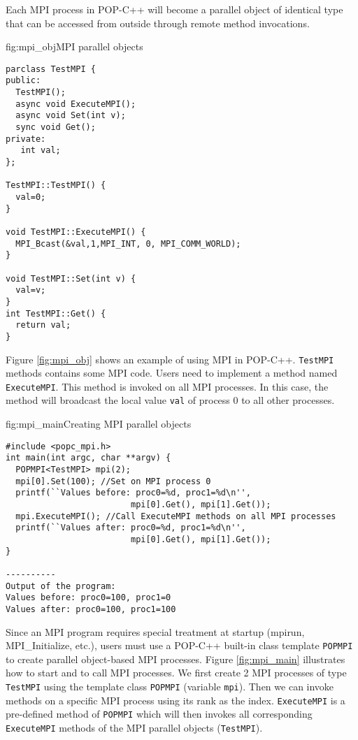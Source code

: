 Each MPI process in POP-C++ will become a parallel object of identical type that can be accessed from outside through remote method invocations.

\begin{figura}{fig:mpi_obj}{MPI parallel objects}%
\vspace{-4mm}%
\begin{verbatim}
parclass TestMPI {
public:
  TestMPI();
  async void ExecuteMPI();
  async void Set(int v);
  sync void Get();
private:
   int val;
};

TestMPI::TestMPI() {
  val=0;
}

void TestMPI::ExecuteMPI() {
  MPI_Bcast(&val,1,MPI_INT, 0, MPI_COMM_WORLD);
}

void TestMPI::Set(int v) {
  val=v;
}
int TestMPI::Get() {
  return val;
}

\end{verbatim}
\end{figura}

Figure \ref{fig:mpi_obj} shows an example of using MPI in POP-C++. \texttt{TestMPI} methods contains some MPI code. Users need to implement a method named \texttt{ExecuteMPI}. This method is invoked on all MPI processes. In this case, the method will broadcast the local value \texttt{val} of process 0 to all other processes.

\begin{figura}{fig:mpi_main}{Creating MPI parallel objects}%
\vspace{-4mm}%
\begin{verbatim} 
#include <popc_mpi.h>
int main(int argc, char **argv) {
  POPMPI<TestMPI> mpi(2);
  mpi[0].Set(100); //Set on MPI process 0
  printf(``Values before: proc0=%d, proc1=%d\n'', 
                         mpi[0].Get(), mpi[1].Get());
  mpi.ExecuteMPI(); //Call ExecuteMPI methods on all MPI processes
  printf(``Values after: proc0=%d, proc1=%d\n'', 
                         mpi[0].Get(), mpi[1].Get());
}

----------
Output of the program:
Values before: proc0=100, proc1=0
Values after: proc0=100, proc1=100

\end{verbatim}
\end{figura}
   

Since an MPI program requires special treatment at startup (mpirun, 
MPI\_Initialize, etc.), users must use a POP-C++ built-in class 
template \texttt{POPMPI} to create parallel object-based MPI processes. 
Figure \ref{fig:mpi_main} illustrates how to start and to call MPI processes. 
We first create 2 MPI processes of type \texttt{TestMPI} using the template 
class \texttt{POPMPI} (variable \texttt{mpi}). Then we can invoke methods 
on a specific MPI process using its rank as the index. \texttt{ExecuteMPI} 
is a pre-defined method of \texttt{POPMPI} which will then invokes all 
corresponding \texttt{ExecuteMPI} methods of the MPI parallel objects 
(\texttt{TestMPI}).


